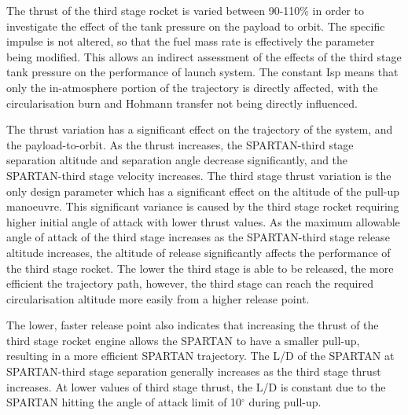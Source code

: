 The thrust of the third stage rocket is varied between 90-110\% in order to investigate the effect of the tank pressure on the payload to orbit. The specific impulse is not altered, so that the fuel mass rate is effectively the parameter being modified. This allows an indirect assessment of the effects of the third stage tank pressure on the performance of launch system. The constant Isp means that only the in-atmosphere portion of the trajectory is directly affected, with the circularisation burn and Hohmann transfer not being directly influenced. 

The thrust variation has a significant effect on the trajectory of the system, and the payload-to-orbit. As the thrust increases, the SPARTAN-third stage separation altitude and separation angle decrease significantly, and the SPARTAN-third stage velocity increases. 
The third stage thrust variation is the only design parameter which has a significant effect on the altitude of the pull-up manoeuvre. This significant variance is caused by the third stage rocket requiring higher initial angle of attack with lower thrust values. As the maximum allowable angle of attack of the third stage increases as the SPARTAN-third stage release altitude increases, the altitude of release significantly affects the performance of the third stage rocket. The lower the third stage is able to be released, the more efficient the trajectory path, however, the third stage can reach the required circularisation altitude more easily from a higher release point. 

The lower, faster release point also indicates that increasing the thrust of the third stage rocket engine allows the SPARTAN to have a smaller pull-up, resulting in a more efficient SPARTAN trajectory. The L/D of the SPARTAN at SPARTAN-third stage separation generally increases as the third stage thrust increases. At lower values of third stage thrust, the L/D is constant due to the SPARTAN hitting the angle of attack limit of 10$^\circ$ during pull-up. 

